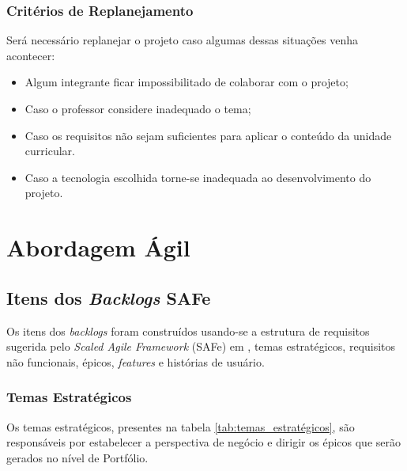\documentclass[
	12pt,				%
	oneside,			%
	a4paper,			%
	english,			%
	brazil,				%
	]{abntex2}
\begin{document}
\section{Critérios de Replanejamento}
Será necessário replanejar o projeto caso algumas dessas situações venha acontecer:
\begin{itemize}
    \item Algum integrante ficar impossibilitado de colaborar com o projeto;
    \item Caso o professor considere inadequado o tema;
    \item Caso os requisitos não sejam suficientes para aplicar o conteúdo da unidade curricular.
    \item Caso a tecnologia escolhida torne-se inadequada ao desenvolvimento do projeto.
\end{itemize}

\part{Abordagem Ágil}

\chapter{Itens dos \textit{Backlogs} SAFe}
Os itens dos \textit{backlogs} foram construídos usando-se a estrutura de requisitos sugerida pelo \foreignlanguage{english}{\textit{Scaled Agile Framework}} (SAFe) em \cite{safe_requirements_model}, temas estratégicos, requisitos não funcionais, épicos, \textit{features} e histórias de usuário.

\section{Temas Estratégicos}
Os temas estratégicos, presentes na tabela \ref{tab:temas_estratégicos}, são responsáveis por estabelecer a perspectiva de negócio e dirigir os épicos que serão gerados no nível de Portfólio.

\begin{table}[ht]
\end{table}
\end{document}

